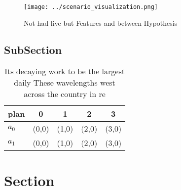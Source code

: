 \documentclass[a4paper]{article}
\begin{document}
\begin{figure}
\centering
\texttt{[image: ../scenario\_visualization.png]}
\caption{Not had live but Features and between Hypothesis 
}
\end{figure}
 
\subsection{SubSection}

\begin{table}
\begin{adjustbox}{width=0.5\columnwidth}
\begin{tabular}{|l|l|l|l|l|}
\hline
\textbf{plan} & \multicolumn{1}{c|}{\textbf{0}} & \multicolumn{1}{c|}{\textbf{1}} & \multicolumn{1}{c|}{\textbf{2}} & \multicolumn{1}{c|}{\textbf{3}} \\ \hline
\textbf{$a_0$}  & (0,0) & (1,0) & (2,0) & (3,0) \\ \hline
\textbf{$a_1$}  & (0,0) & (1,0) & (2,0) & (3,0) \\ \hline
\end{tabular}
\end{adjustbox}
\caption{Its decaying work to be the largest daily These wavelengths west across the country in re
}
\end{table}

\section{Section}
\end{document}
